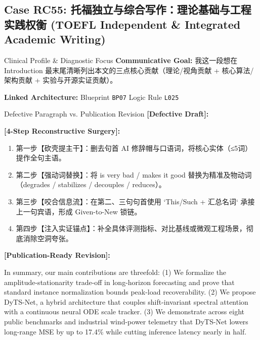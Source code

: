 \subsection{Case RC55: 托福独立与综合写作：理论基础与工程实践权衡 (TOEFL Independent \& Integrated Academic Writing)}\label{case:RC55}
\begin{ConceptBox}{Clinical Profile \& Diagnostic Focus}
\textbf{Communicative Goal:} 我这一段想在 Introduction 最末尾清晰列出本文的三点核心贡献（理论/视角贡献 + 核心算法/架构贡献 + 实验与开源实证贡献）。\par
\textbf{Linked Architecture:} Blueprint \texttt{BP07} \enspace\textbar\enspace Logic Rule \texttt{L025}
\end{ConceptBox}
\begin{ExampleBox}{Defective Paragraph vs. Publication Revision}
\textbf{\color{TargetHighlight}[Defective Draft]:}\par
{}\par\vspace{6pt}
\textbf{\color{AcadForest}[4-Step Reconstructive Surgery]:}
\begin{enumerate}[label=\textbf{\color{AcadNavy}Step \arabic*:}, leftmargin=2em]
  \item 第一步【砍壳提主干】：删去句首 AI 修辞帽与口语词，将核心实体（≤5词）提作全句主语。
  \item 第二步【强动词替换】：将 is very bad / makes it good 替换为精准及物动词（degrades / stabilizes / decouples / reduces）。
  \item 第三步【咬合信息流】：在第二、三句句首使用 `This/Such + 汇总名词` 承接上一句宾语，形成 Given-to-New 锁链。
  \item 第四步【注入实证锚点】：补全具体评测指标、对比基线或微观工程场景，彻底消除空洞夸张。
\end{enumerate}\vspace{4pt}
\textbf{\color{AcadNavy}[Publication-Ready Revision]:}\par
In summary, our main contributions are threefold: (1) We formalize the amplitude-stationarity trade-off in long-horizon forecasting and prove that standard instance normalization bounds peak-load recoverability. (2) We propose DyTS-Net, a hybrid architecture that couples shift-invariant spectral attention with a continuous neural ODE scale tracker. (3) We demonstrate across eight public benchmarks and industrial wind-power telemetry that DyTS-Net lowers long-range MSE by up to 17.4\% while cutting inference latency nearly in half.
\end{ExampleBox}
